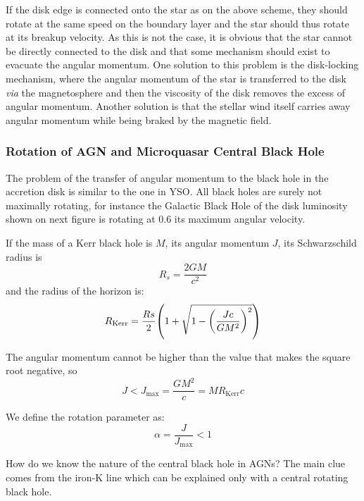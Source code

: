 \documentclass[10pt,a4paper,english]{article}
\let\originalleft\left
\let\originalright\right
\renewcommand{\left}{\mathopen{}\mathclose\bgroup\originalleft}
\renewcommand{\right}{\aftergroup\egroup\originalright}
\begin{document}
If the disk edge is connected onto the star as on the above scheme, they should
rotate at the same speed on the boundary layer and the star should thus rotate
at its breakup velocity. As this is not the case, it is obvious that the star
cannot be directly connected to the disk and that some mechanism should exist
to evacuate the angular momentum. One solution to this problem is the
disk-locking mechanism, where the angular momentum of the star is transferred
to the disk \emph{via} the magnetosphere and then the viscosity of the disk
removes the excess of angular momentum. Another solution is that the stellar
wind itself carries away angular momentum while being braked by the magnetic
field.

\subsubsection{Rotation of AGN and Microquasar Central Black Hole}

The problem of the transfer of angular momentum to the black hole in the
accretion disk is similar to the one in YSO. All black holes are surely not
maximally rotating, for instance the Galactic Black Hole of the disk luminosity
shown on next figure is rotating at 0.6 its maximum angular velocity.

If the mass of a Kerr black hole is $M$, its angular momentum $J$, its
Schwarzschild radius is
\begin{equation}
    R_s = \frac{2GM}{c^2}
\end{equation}
and the radius of the horizon is:
\begin{equation}
    R_\mathrm{Kerr} = \frac{Rs}{2} \left( 1 + \sqrt{1-\left( \frac{Jc}{GM^2} \right)^2 } \right)
\end{equation}

The angular momentum cannot be higher than the value that makes the square root
negative, so
\begin{equation}
    J < J_\mathrm{max} = \frac{GM^2}{c} = MR_\mathrm{Kerr}c
\end{equation}

We define the rotation parameter as:
\begin{equation}
    \alpha = \frac{J}{J_\mathrm{max}} < 1
\end{equation}

How do we know the nature of the central black hole in AGNs? The main clue
comes from the iron-K line which can be explained only with a central rotating
black hole.
\end{document}
